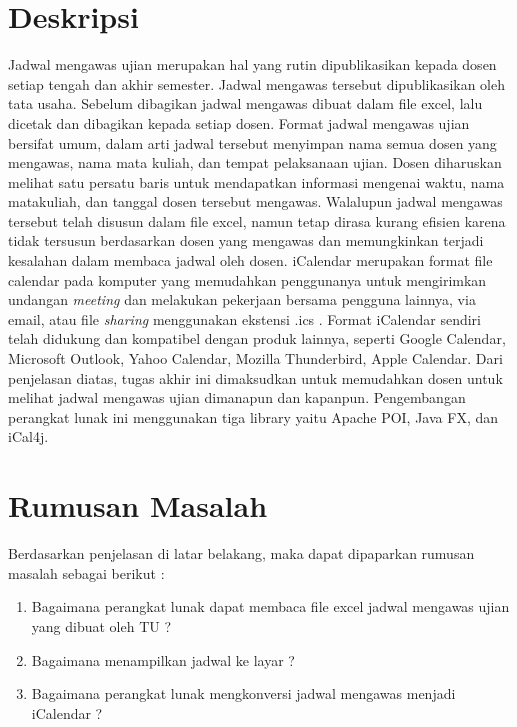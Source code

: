 \documentclass[a4paper,twoside]{article}
\begin{document}
\title{\@judultopik}
\author{\nama \textendash \@npm} 

\newcommand{\nama}{Ariq Rahmaeri}
\newcommand{\@npm}{2011730066}
\newcommand{\@judultopik}{Konversi Jadwal Mengawas Ujian Ke Format ICS dengan Apache POI, iCal4j, dan Java FX} %
\newcommand{\jumpemb}{1} %
\newcommand{\tanggal}{05/08/2016}


\maketitle


\section{Deskripsi}
\indent Jadwal mengawas ujian merupakan hal yang rutin dipublikasikan kepada dosen setiap tengah dan akhir semester. Jadwal mengawas tersebut dipublikasikan oleh tata usaha. Sebelum dibagikan jadwal mengawas dibuat dalam file excel, lalu dicetak dan dibagikan kepada setiap dosen. Format jadwal mengawas ujian bersifat umum, dalam arti jadwal tersebut menyimpan nama semua dosen yang mengawas, nama mata kuliah, dan tempat pelaksanaan ujian. Dosen diharuskan melihat satu persatu baris untuk mendapatkan informasi mengenai waktu, nama matakuliah, dan tanggal dosen tersebut mengawas. Walalupun jadwal mengawas tersebut telah disusun dalam file excel, namun tetap dirasa kurang efisien karena tidak tersusun berdasarkan dosen yang mengawas dan memungkinkan terjadi kesalahan dalam membaca jadwal oleh dosen. 
iCalendar merupakan format file calendar pada komputer yang memudahkan penggunanya untuk mengirimkan undangan \textit{meeting} dan melakukan pekerjaan bersama pengguna lainnya, via email, atau file \textit{sharing} menggunakan ekstensi .ics . Format iCalendar sendiri telah didukung dan kompatibel dengan produk lainnya, seperti Google Calendar, Microsoft Outlook, Yahoo Calendar, Mozilla Thunderbird, Apple Calendar.
Dari penjelasan diatas, tugas akhir ini dimaksudkan untuk memudahkan dosen untuk melihat jadwal mengawas ujian dimanapun dan kapanpun. Pengembangan perangkat lunak ini menggunakan tiga library yaitu Apache POI, Java FX, dan iCal4j.    

\section{Rumusan Masalah}
Berdasarkan penjelasan di latar belakang, maka dapat dipaparkan rumusan masalah sebagai berikut :
\begin{enumerate}
	\item Bagaimana perangkat lunak dapat membaca file excel jadwal mengawas ujian yang dibuat oleh TU ?
	\item Bagaimana menampilkan jadwal ke layar ?
	\item Bagaimana perangkat lunak mengkonversi jadwal mengawas menjadi iCalendar ? 
\end{enumerate}
\end{document}
